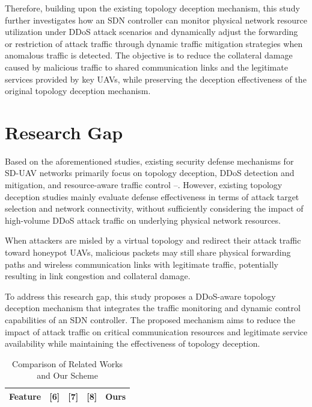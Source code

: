 \begin{ZhChapter}
Therefore, building upon the existing topology deception mechanism, this study further investigates how an SDN controller can monitor physical network resource utilization under DDoS attack scenarios and dynamically adjust the forwarding or restriction of attack traffic through dynamic traffic mitigation strategies when anomalous traffic is detected. The objective is to reduce the collateral damage caused by malicious traffic to shared communication links and the legitimate services provided by key UAVs, while preserving the deception effectiveness of the original topology deception mechanism.

\section{Research Gap}

Based on the aforementioned studies, existing security defense mechanisms for SD-UAV networks primarily focus on topology deception, DDoS detection and mitigation, and resource-aware traffic control \cite{tan:2022}--\cite{rostami:2024}. However, existing topology deception studies mainly evaluate defense effectiveness in terms of attack target selection and network connectivity, without sufficiently considering the impact of high-volume DDoS attack traffic on underlying physical network resources.

When attackers are misled by a virtual topology and redirect their attack traffic toward honeypot UAVs, malicious packets may still share physical forwarding paths and wireless communication links with legitimate traffic, potentially resulting in link congestion and collateral damage.

To address this research gap, this study proposes a DDoS-aware topology deception mechanism that integrates the traffic monitoring and dynamic control capabilities of an SDN controller. The proposed mechanism aims to reduce the impact of attack traffic on critical communication resources and legitimate service availability while maintaining the effectiveness of topology deception.

\begin{table}[htbp]
    \centering
    \caption{Comparison of Related Works and Our Scheme}
    \label{tab:related_work_comparison}

    \small
    \renewcommand{\arraystretch}{1.3}
    \setlength{\tabcolsep}{6pt}

    \begin{tabularx}{\linewidth}{@{}Xcccc@{}}
        \hline
        \textbf{Feature}
        & \textbf{[6]}
        & \textbf{[7]}
        & \textbf{[8]}
        & \textbf{Ours} \\
        \hline


\end{tabularx}
\end{table}
\end{ZhChapter}
